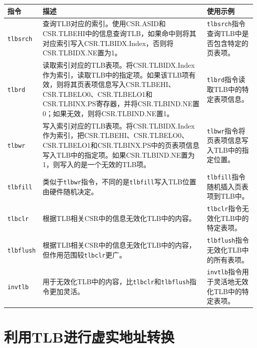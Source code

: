 \begin{longtable}[]{@{}
  >{\raggedright\arraybackslash}p{}
  >{\raggedright\arraybackslash}p{}
  >{\raggedright\arraybackslash}p{}@{}}
\toprule\noalign{}
\begin{minipage}[b]{\linewidth}\raggedright
指令
\end{minipage} & \begin{minipage}[b]{\linewidth}\raggedright
描述
\end{minipage} & \begin{minipage}[b]{\linewidth}\raggedright
使用示例
\end{minipage} \\
\midrule\noalign{}
\endhead
\bottomrule\noalign{}
\endlastfoot
\texttt{tlbsrch} & 查询TLB对应的索引。使用CSR.ASID和CSR.TLBEHI中的信息查询TLB，如果命中则将其对应索引写入CSR.TLBIDX.Index，否则将CSR.TLBIDX.NE置为1。 & \texttt{tlbsrch}指令查询TLB中是否包含特定的页表项。 \\
\texttt{tlbrd} & 读取索引对应的TLB表项。将CSR.TLBIDX.Index作为索引，读取TLB中的指定项。如果该TLB项有效，则将其页表项信息写入CSR.TLBEHI、CSR.TLBELO0、CSR.TLBELO1和CSR.TLBINX.PS寄存器，并将CSR.TLBIND.NE置0；如果无效，则将CSR.TLBIND.NE置1。 & \texttt{tlbrd}指令读取TLB中的特定表项信息。 \\
\texttt{tlbwr} & 写入索引对应的TLB表项。将CSR.TLBIDX.Index作为索引，把CSR.TLBEHI、CSR.TLBELO0、CSR.TLBELO1和CSR.TLBINX.PS中的页表项信息写入TLB中的指定项。如果CSR.TLBIND.NE置为1，则写入的是一个无效的TLB项。 & \texttt{tlbwr}指令将页表项信息写入TLB中的指定位置。 \\
\texttt{tlbfill} & 类似于\texttt{tlbwr}指令，不同的是\texttt{tlbfill}写入TLB位置由硬件随机决定。 & \texttt{tlbfill}指令随机插入页表项到TLB中。 \\
\texttt{tlbclr} & 根据TLB相关CSR中的信息无效化TLB中的内容。 & \texttt{tlbclr}指令无效化TLB中的特定表项。 \\
\texttt{tlbflush} & 根据TLB相关CSR中的信息无效化TLB中的内容，但作用范围较\texttt{tlbclr}更广。 & \texttt{tlbflush}指令无效化TLB中的所有表项。 \\
\texttt{invtlb} & 用于无效化TLB中的内容，比\texttt{tlbclr}和\texttt{tlbflush}指令更加灵活。 & \texttt{invtlb}指令用于灵活地无效化TLB中的特定表项。 \\
\end{longtable}

\section{利用TLB进行虚实地址转换}\label{sec:10-mmu-012}

